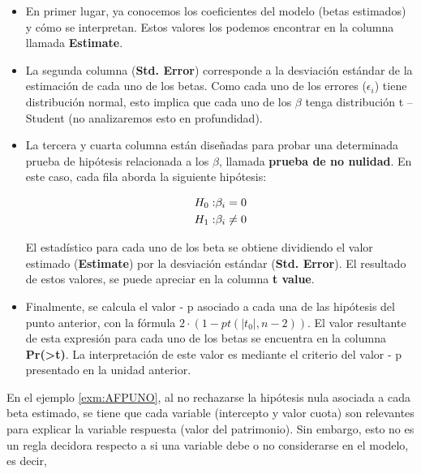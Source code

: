 \documentclass[
  11pt,
]{book}
\theoremstyle{definition}
\theoremstyle{definition}
\theoremstyle{definition}
\theoremstyle{definition}
\theoremstyle{remark}
\begin{document}
\begin{itemize}
\item
  En primer lugar, ya conocemos los coeficientes del modelo (betas estimados) y cómo se interpretan. Estos valores los podemos encontrar en la columna llamada \textbf{Estimate}.
\item
  La segunda columna (\textbf{Std. Error}) corresponde a la desviación estándar de la estimación de cada uno de los betas. Como cada uno de los errores (\(\epsilon_i\)) tiene distribución normal, esto implica que cada uno de los \(\beta\) tenga distribución t -- Student (no analizaremos esto en profundidad).
\item
  La tercera y cuarta columna están diseñadas para probar una determinada prueba de hipótesis relacionada a los \(\beta\), llamada \textbf{prueba de no nulidad}. En este caso, cada fila aborda la siguiente hipótesis:

  \begin{equation}
  \notag
  \begin{split}
  H_0:&\beta_i = 0\\
  H_1:&\beta_i \neq 0\\
  \end{split}
  \end{equation}

  El estadístico para cada uno de los beta se obtiene dividiendo el valor estimado (\textbf{Estimate}) por la desviación estándar (\textbf{Std. Error}). El resultado de estos valores, se puede apreciar en la columna \textbf{t value}.
\item
  Finalmente, se calcula el valor - p asociado a cada una de las hipótesis del punto anterior, con la fórmula \(2\cdot(1-pt(|t_0|, n-2))\). El valor resultante de esta expresión para cada uno de los betas se encuentra en la columna \textbf{Pr(\textgreater\textbar t\textbar)}. La interpretación de este valor es mediante el criterio del valor - p presentado en la unidad anterior.
\end{itemize}

En el ejemplo \ref{exm:AFPUNO}, al no rechazarse la hipótesis nula asociada a cada beta estimado, se tiene que cada variable (intercepto y valor cuota) son relevantes para explicar la variable respuesta (valor del patrimonio). Sin embargo, esto no es un regla decidora respecto a si una variable debe o no considerarse en el modelo, es decir,
\end{document}
